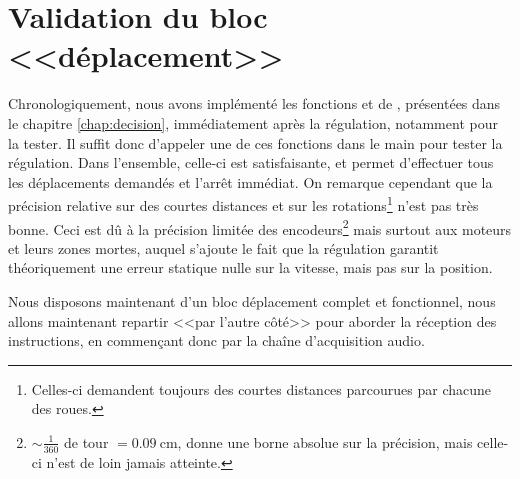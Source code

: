 \section{Validation du bloc <<déplacement>>}
Chronologiquement, nous avons implémenté les fonctions  et  de , présentées dans le chapitre \ref{chap:decision}, immédiatement après la régulation, notamment pour la tester. Il suffit donc d'appeler une de ces fonctions dans le main pour tester la régulation. Dans l'ensemble, celle-ci est satisfaisante, et permet d'effectuer tous les déplacements demandés et l'arrêt immédiat. On remarque cependant que la précision relative sur des courtes distances et sur les rotations\footnote{Celles-ci demandent toujours des courtes distances parcourues par chacune des roues.} n'est pas très bonne. Ceci est dû à la précision limitée des encodeurs\footnote{$\sim\frac{1}{360}$ de tour $ = \SI{0.09}{\centi\meter}$, donne une borne absolue sur la précision, mais celle-ci n'est de loin jamais atteinte.} mais surtout aux moteurs et leurs zones mortes, auquel s'ajoute le fait que la régulation garantit théoriquement une erreur statique nulle sur la vitesse, mais pas sur la position.

Nous disposons maintenant d'un bloc déplacement complet et fonctionnel, nous allons maintenant repartir <<par l'autre côté>> pour aborder la réception des instructions, en commençant donc par la chaîne d'acquisition audio.
